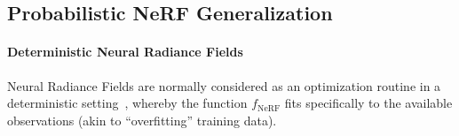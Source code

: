 

\subsection{Probabilistic NeRF Generalization}

\paragraph{Deterministic Neural Radiance Fields} Neural Radiance Fields are normally considered as an optimization routine in a deterministic setting~\citep{mildenhall2021nerf,barron2021mip}, whereby the function $f_{\text{NeRF}}$ fits specifically to the available observations (akin to ``overfitting'' training data).

